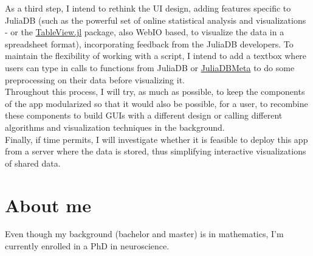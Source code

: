 \documentclass[10pt,a4paper]{report}
\begin{document}
As a third step, I intend to rethink the UI design, adding features specific to JuliaDB (such as the powerful set of online statistical analysis and visualizations - or the \href{https://github.com/JuliaComputing/TableView.jl}{TableView.jl} package, also WebIO based, to visualize the data in a spreadsheet format), incorporating feedback from the JuliaDB developers. To maintain the flexibility of working with a script, I intend to add a textbox where users can type in calls to functions from JuliaDB or \href{https://github.com/piever/JuliaDBMeta.jl}{JuliaDBMeta} to do some preprocessing on their data before visualizing it.\\

Throughout this process, I will try, as much as possible, to keep the components of the app modularized so that it would also be possible, for a user, to recombine these components to build GUIs with a different design or calling different algorithms and visualization techniques in the background.\\

Finally, if time permits, I will investigate whether it is feasible to deploy this app from a server where the data is stored, thus simplifying interactive visualizations of shared data.

\section*{About me}

Even though my background (bachelor and master) is in mathematics, I'm currently enrolled in a PhD in neuroscience. 
\end{document}
